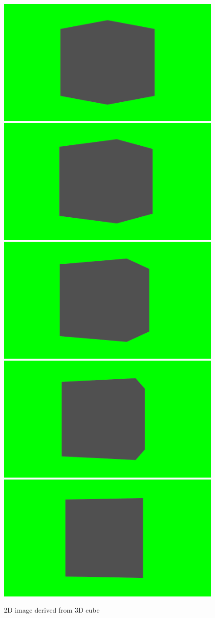 \documentclass{report}
\begin{document}
\begin{figure}[h!]
\center
\includegraphics[width=.25\textwidth]{../images/cube_01/0001.png}
\includegraphics[width=.25\textwidth]{../images/cube_01/0010.png}
\includegraphics[width=.25\textwidth]{../images/cube_01/0020.png}
\includegraphics[width=.25\textwidth]{../images/cube_01/0030.png}
\includegraphics[width=.25\textwidth]{../images/cube_01/0040.png}
\caption[]{2D image derived from 3D cube}
\label{fig:2dCube1}
\end{figure}
\end{document}
